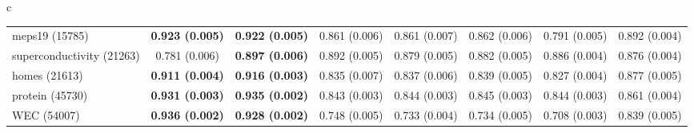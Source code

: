 \documentclass[border=6pt]{standalone}
\begin{document}
\begin{adjustbox}{max width=\linewidth}
\begin{tabular}{c}
\begin{tabular}{lccccccc}
meps19 (15785) & \textbf{0.923 (0.005)} & \textbf{0.922 (0.005)} & 0.861 (0.006) & 0.861 (0.007) & 0.862 (0.006) & 0.791 (0.005) & 0.892 (0.004)\\
superconductivity (21263) & 0.781 (0.006) & \textbf{0.897 (0.006)} & 0.892 (0.005) & 0.879 (0.005) & 0.882 (0.005) & 0.886 (0.004) & 0.876 (0.004)\\
homes (21613) & \textbf{0.911 (0.004)} & \textbf{0.916 (0.003)} & 0.835 (0.007) & 0.837 (0.006) & 0.839 (0.005) & 0.827 (0.004) & 0.877 (0.005)\\
protein (45730) & \textbf{0.931 (0.003)} & \textbf{0.935 (0.002)} & 0.843 (0.003) & 0.844 (0.003) & 0.845 (0.003) & 0.844 (0.003) & 0.861 (0.004)\\
WEC (54007) & \textbf{0.936 (0.002)} & \textbf{0.928 (0.002)} & 0.748 (0.005) & 0.733 (0.004) & 0.734 (0.005) & 0.708 (0.003) & 0.839 (0.005)\\
\hline
\end{tabular}
\end{tabular}
\end{adjustbox}
\end{document}
